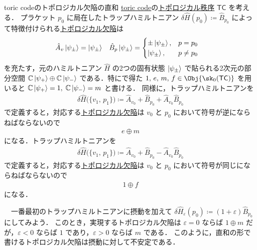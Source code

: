\documentclass[TQFT_main]{subfiles}
\begin{document}
\begin{myexample}[label=ex:toric-semisimple]{toric codeのトポロジカル欠陥の直和}
    \hyperref[ex:toric-emf]{toric code}の\hyperref[def:quantum-phase]{トポロジカル秩序} $\mathsf{TC}$ を考える．
    プラケット $p_0$ に局在したトラップハミルトニアン $\delta \hat{H}(p_0) \coloneqq \hat{B}_{p_0}$ によって特徴付けられる\hyperref[def:TD]{トポロジカル欠陥}は
    \begin{align}
        \hat{A}_v \ket{\psi_{\pm}} &= \ket{\psi_{\pm}}
        &
        \hat{B}_p \ket{\psi_{\pm}} &= 
        \begin{cases}
            \pm\ket{\psi_{\pm}}, &p=p_0 \\
            \ket{\psi_{\pm}}, &p\neq p_0
        \end{cases}
    \end{align}
    を充たす，元のハミルトニアン $\hat{H}$ の2つの固有状態 $\ket{\psi_{\pm}}$ で貼られる2次元の部分空間 $\mathbb{C} \ket{\psi_+} \oplus \mathbb{C} \ket{\psi_-}$ である．特にで得た $1,\, e,\, m,\, f \in \Obj{\sk_0(\mathsf{TC})}$ を用いると $\mathbb{C} \ket{\psi_+} = 1,\; \mathbb{C} \ket{\psi_-} = m$ と書ける．
    同様に，トラップハミルトニアンを
    \begin{align}
        \delta \hat{H} \bigl( \{v_1,\, p_1\} \bigr) \coloneqq \hat{A}_{v_0} + \hat{B}_{p_0} + \hat{A}_{v_0} \hat{B}_{p_0}
    \end{align}
    で定義すると，対応する\hyperref[def:TD]{トポロジカル欠陥}は $v_0$ と $p_0$ において符号が逆にならねばならないので
    \begin{align}
        e \oplus m
    \end{align}
    になる．トラップハミルトニアンを
    \begin{align}
        \delta \hat{H} \bigl( \{v_1,\, p_1\} \bigr) \coloneqq \hat{A}_{v_0} + \hat{B}_{p_0} - \hat{A}_{v_0} \hat{B}_{p_0}
    \end{align}
    で定義すると，対応する\hyperref[def:TD]{トポロジカル欠陥}は $v_0$ と $p_0$ において符号が同じにならねばならないので
    \begin{align}
        1 \oplus f
    \end{align}
    になる．

    　一番最初のトラップハミルトニアンに摂動を加えて $\delta \hat{H}_{\varepsilon} (p_0) \coloneqq (1+\varepsilon) \hat{B}_{p_0}$ にしてみよう．
    このとき，実現するトポロジカル欠陥は $\varepsilon = 0$ ならば $1 \oplus m$ だが，$\varepsilon < 0$ ならば $1$ であり，$\varepsilon > 0$ ならば $m$ である．
    このように，直和の形で書けるトポロジカル欠陥は摂動に対して不安定である．
\end{myexample}
\end{document}
